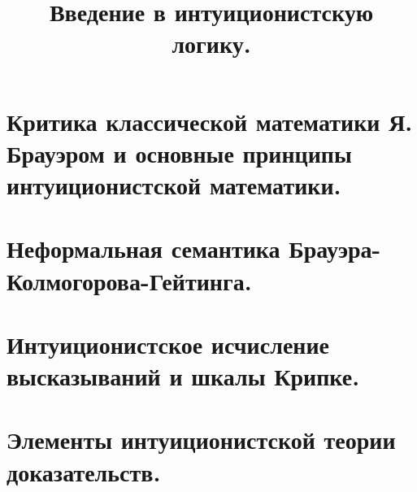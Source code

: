 \documentclass[a4paper]{article}
\begin{document}
\title{Введение в интуиционистскую логику.}
\section{Критика классической математики Я. Брауэром и основные принципы интуиционистской математики.}
\section{Неформальная семантика Брауэра-Колмогорова-Гейтинга.}
\section{Интуиционистское исчисление высказываний и шкалы Крипке.}
\section{Элементы интуиционистской теории доказательств.}
\end{document}
